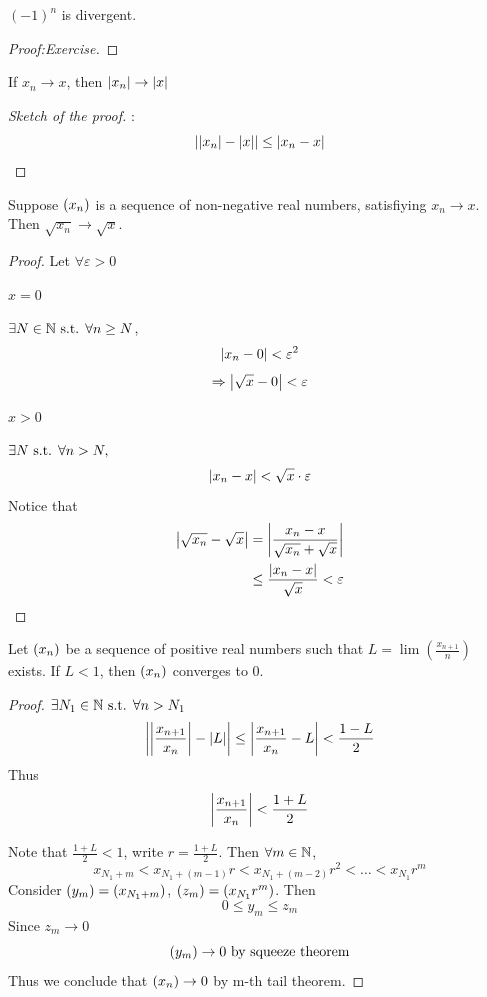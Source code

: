 \documentclass[a4paper,12pt]{article}
\begin{document}
\begin{proposition}
    \((-1)^n\) is divergent.
    \begin{proof}[Proof:Exercise]
        
    \end{proof}
\end{proposition}

\begin{theorem}
    If \(x_n\rightarrow x\), then \(\left\lvert x_n\right\rvert\rightarrow \left\lvert x\right\rvert\)
    \begin{proof}[Sketch of the proof]:
        \[\left\lvert \left\lvert x_n\right\rvert-\left\lvert x\right\rvert\right\rvert\le \left\lvert x_n-x\right\rvert\]
        
    \end{proof}
\end{theorem}

\begin{theorem}
    Suppose \((x_{n})\) is a sequence of non-negative real numbers, satisfiying \(x_n\rightarrow x\).
    Then \(\sqrt{x_n}\rightarrow\sqrt{x}\).
    \begin{proof} Let \(\forall \varepsilon>0\)

         \(x=0\)

        \(\exists N\in\mathbb{N} \text{ s.t. } \forall n\ge N\), \[\left\lvert x_n-0\right\rvert<\varepsilon^2\]
        \[\Rightarrow \left\lvert \sqrt{x}-0\right\rvert<\varepsilon\]

         \(x>0\)

        \(\exists N \text{ s.t. } \forall n>N,\) \[\left\lvert x_n-x\right\rvert<\sqrt{x}\cdot\varepsilon\]
        Notice that
        \begin{align*}
            \left\lvert \sqrt{x_n}-\sqrt{x}\right\rvert&=\left\lvert \frac{x_n-x}{\sqrt{x_n}+\sqrt{x}}\right\rvert\\
            &\le \frac{\left\lvert x_n-x\right\rvert}{\sqrt{x}}<\varepsilon
        \end{align*}
    \end{proof}
\end{theorem}

\begin{theorem}
    Let \((x_{n})\) be a sequence of positive real numbers such that \(L=\lim(\frac{x_{n+1}}{n})\) exists. 
    If \(L<1\), then \((x_{n})\) converges to 0.

    \begin{proof}
        \(\exists N_1\in\mathbb{N} \text{ s.t. } \forall n>N_1\)
        \[\left\lvert \left\lvert \frac{x_{n+1}}{x_n}\right\rvert-\left\lvert L\right\rvert\right\rvert\le\left\lvert \frac{x_{n+1}}{x_n}-L\right\rvert<\frac{1-L}{2}\]
        Thus \[\left\lvert \frac{x_{n+1}}{x_n}\right\rvert<\frac{1+L}{2}\]

        Note that \(\frac{1+L}{2}<1\), write \(r=\frac{1+L}{2}\).
        Then \(\forall m\in\mathbb{N}\),
        \[x_{N_1+m}<x_{N_1+(m-1)}r<x_{N_1+(m-2)}r^2<\dots<x_{N_1}r^m\]
        Consider \((y_{m})=(x_{N_1+m})\), \((z_{m})=(x_{N_1}r^m)\). Then 
        \[0\le y_m\le z_m\]
        Since \(z_m\rightarrow 0\)
        \[(y_{m})\rightarrow 0 \text{ by squeeze theorem}\]
        Thus we conclude that \((x_{n})\rightarrow 0\) by m-th tail theorem.
    \end{proof}
\end{theorem}
\end{document}
